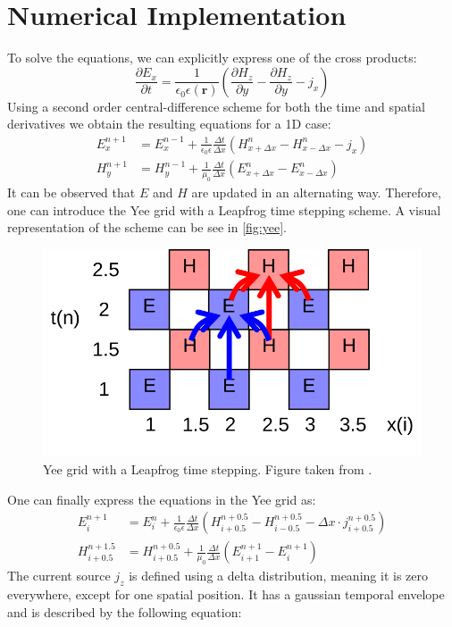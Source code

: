 \documentclass[a4paper,12pt]{scrartcl}
\begin{document}
 \section{Numerical Implementation}
    To solve the equations, we can explicitly express one of the cross products:
    \begin{equation}
        \frac{\partial E_x}{\partial t} = \frac1{\epsilon_0 \epsilon(\mathbf r)} \left( \frac{\partial H_z}{\partial y} -  \frac{\partial H_z}{\partial y} - j_x \right)
    \end{equation}
    Using a second order central-difference scheme for both the time and spatial
    derivatives we obtain the resulting equations for a 1D case:
    \begin{align}
        E_x^{n+1} &= E_x^{n-1} +  \frac1{\epsilon_0 \epsilon} \frac{\Delta t}{\Delta x} (H_{x+\Delta x}^n - H_{x-\Delta x}^n - j_x)\\
        H_y^{n+1} &= H_y^{n-1} +  \frac1{\mu_0} \frac{\Delta t}{\Delta x} (E_{x+\Delta x}^n - E_{x-\Delta x}^n)
    \end{align}
    It can be observed that $E$ and $H$ are updated in an alternating way.
    Therefore, one can introduce the Yee grid with a Leapfrog time stepping scheme.
    A visual representation of the scheme can be see in \autoref{fig:yee}.
    \begin{figure}[H]
        \centering
        \includegraphics[width=.5\textwidth]{figures/yee.png}
        \caption{Yee grid with a Leapfrog time stepping. Figure taken from \cite{lecture}.}
        \label{fig:yee}
    \end{figure}
    One can finally express the equations in the Yee grid as:
        \begin{align}
        E_i^{n+1} &= E_i^{n} +  \frac1{\epsilon_0 \epsilon} \frac{\Delta t}{\Delta x} (H_{i+0.5}^{n+0.5} - H_{i-0.5}^{n+0.5} - \Delta x \cdot j_{i+0.5}^{n+0.5})\\
        H_{i+0.5}^{n+1.5} &= H_{i+0.5}^{n+0.5} +  \frac1{\mu_0} \frac{\Delta t}{\Delta x} (E_{i+1}^{n+1} - E_{i}^{n+1})
    \end{align}
    The current source $j_z$ is defined using a delta distribution, meaning it is zero everywhere, except for one spatial position. It has a gaussian temporal envelope and is described by the following equation:
\end{document}
